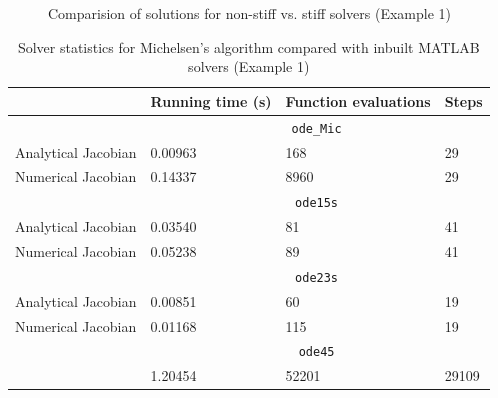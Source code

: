 \documentclass[letterpaper,12pt,onehalfspacing,twoside]{article}
\theoremstyle{msds}
\begin{document}
\begin{figure}[htbp]
\centering
{}
\quad
{}
\caption{Comparision of solutions for non-stiff vs. stiff solvers (Example 1)}
\label{fig:ex1_solvers}
\end{figure}


\begin{table}[htbp]
\centering
\caption{Solver statistics for Michelsen's algorithm compared with inbuilt MATLAB solvers (Example 1)}
\label{tab:ex1_solvers}
\begin{tabular}{@{}llll@{}}
\toprule
                    & Running time (s)  & Function evaluations        & Steps \\ \midrule
                    & \multicolumn{3}{c}{\texttt{ode\_Mic}} \\ \cmidrule(l){2-4} 
Analytical Jacobian & 0.00963       & 168           & 29    \\
Numerical Jacobian  & 0.14337       & 8960          & 29    \\ \cmidrule(l){2-4} 
                    & \multicolumn{3}{c}{\texttt{ode15s}}   \\ \cmidrule(l){2-4} 
Analytical Jacobian & 0.03540      & 81            & 41    \\
Numerical Jacobian  & 0.05238      & 89            & 41    \\ \cmidrule(l){2-4} 
                    & \multicolumn{3}{c}{\texttt{ode23s}}   \\ \cmidrule(l){2-4} 
Analytical Jacobian & 0.00851      & 60            & 19    \\
Numerical Jacobian  & 0.01168      & 115           & 19    \\ \cmidrule(l){2-4} 
                    & \multicolumn{3}{c}{\texttt{ode45}}    \\ \cmidrule(l){2-4} 
 		       & 1.20454      & 52201  & 29109 \\ \bottomrule
\end{tabular}
\end{table}
\end{document}
